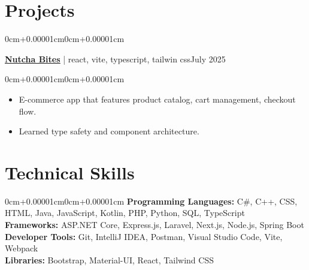 \documentclass[10pt, letterpaper]{article}
\newenvironment{highlights}{\begin{itemize}[topsep=0.10cm,parsep=0.10cm,partopsep=0pt,itemsep=0pt,leftmargin=0cm+10pt]}{\end{itemize}}
\newenvironment{onecolentry}{\begin{adjustwidth}{0cm+0.00001cm}{0cm+0.00001cm}}{\end{adjustwidth}}
\newenvironment{twocolentry}[2][]{\onecolentry\def\secondColumn{#2}\setcolumnwidth{\fill,5cm}\begin{paracol}{2}}{\switchcolumn \raggedleft \secondColumn\end{paracol}\endonecolentry}
\begin{document}
\section{Projects}
    \begin{twocolentry}{July 2025}
        \textbf{\underline{\href{https://nutcha-bites.vercel.app/}{Nutcha Bites}}} | react, vite, typescript, tailwin css\end{twocolentry}
    \vspace{0.10cm}
    \begin{onecolentry}
        \begin{highlights}
            \item E-commerce app that features product catalog, cart management, checkout flow.
            \item Learned type safety and component architecture.
        \end{highlights}
    \end{onecolentry}
    \vspace{0.15cm}

\section{Technical Skills}
\begin{onecolentry}
    \textbf{Programming Languages:} C\#, C++, CSS, HTML, Java, JavaScript, Kotlin, PHP, Python, SQL, TypeScript \\
    \vspace{0.10cm}
    \textbf{Frameworks:} ASP.NET Core, Express.js, Laravel, Next.js, Node.js, Spring Boot \\
    \vspace{0.10cm}
    \textbf{Developer Tools:} Git, IntelliJ IDEA, Postman, Visual Studio Code, Vite, Webpack \\
    \vspace{0.10cm}
    \textbf{Libraries:} Bootstrap, Material-UI, React, Tailwind CSS \\
    \vspace{0.10cm}

\end{onecolentry}
\end{document}
